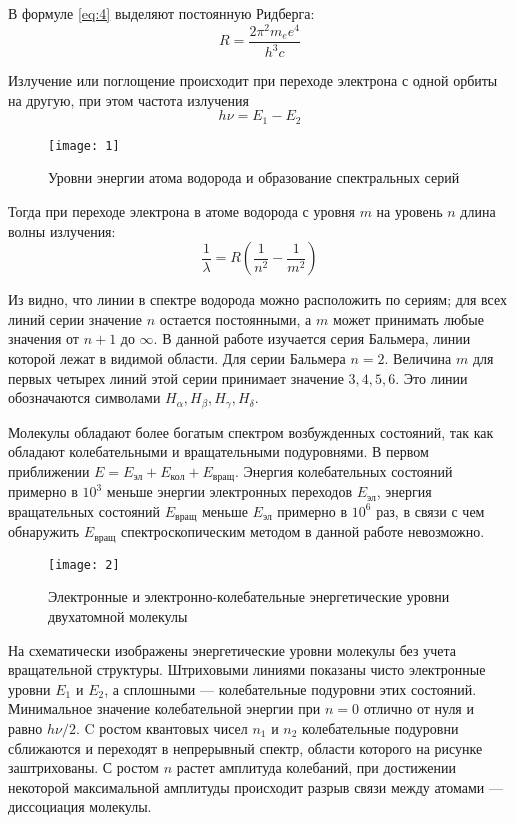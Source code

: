 \documentclass[a4paper, 12pt]{article}
\begin{document}
В формуле \eqref{eq:4} выделяют постоянную Ридберга:
\begin{equation}
    R = \frac{2 \pi^2 m_e e^4}{h^3 c}
    \label{eq:5}
\end{equation}

Излучение или поглощение происходит при
переходе электрона с одной орбиты на другую, при этом частота
излучения
\begin{equation}
    h\nu = E_1 - E_2
    \label{eq:6}
\end{equation}


\begin{wrapfigure}{l}{0.4\linewidth}
    \texttt{[image: 1]}
    \caption{Уровни энергии атома водорода и образование спектральных
    серий}
    \label{fig:1}
\end{wrapfigure}

Тогда при переходе электрона в атоме водорода с уровня $m$ на уровень
$n$ 
длина волны излучения: 
\begin{equation}
    \frac{1}{\lambda} = R \left( \frac{1}{n^2} - \frac{1}{m^2} \right)
    \label{eq:7}
\end{equation}

Из  видно, что линии в спектре водорода можно расположить
по сериям; для всех линий серии значение $n$ остается постоянными, а
$m$ может принимать любые значения от $n+1$ до $\infty$. В данной
работе изучается серия Бальмера, линии которой лежат в видимой
области. Для серии Бальмера $n=2$. Величина $m$ для первых четырех
линий этой серии принимает значение $3, 4, 5, 6$. Это линии обозначаются
символами $H_\alpha, H_\beta, H_\gamma, H_\delta$.

Молекулы обладают более богатым спектром возбужденных состояний, так
как обладают колебательными и вращательными подуровнями. В первом
приближении $E = E_\text{эл} + E_\text{кол} + E_\text{вращ}$. Энергия
колебательных состояний примерно в $10^3$ меньше энергии электронных
переходов $E_\text{эл}$, энергия вращательных состояний
$E_\text{вращ}$ меньше $E_\text{эл}$ примерно в $10^6$ раз, в связи с
чем обнаружить $E_\text{вращ}$ спектроскопическим методом в данной
работе невозможно.


\begin{figure}[H]
    \texttt{[image: 2]} 
    \caption{Электронные и электронно-колебательные энергетические
    уровни двухатомной молекулы}
    \label{fig:2}
\end{figure}

На  схематически изображены энергетические уровни молекулы
без учета вращательной структуры. Штриховыми линиями показаны чисто
электронные уровни $E_1$ и $E_2$, а сплошными --- колебательные
подуровни этих состояний. Минимальное значение колебательной энергии
при $n = 0$ отлично от нуля и равно $h \nu / 2$. C ростом квантовых
чисел $n_1$ и $n_2$ колебательные подуровни сближаются и переходят в
непрерывный спектр, области которого на рисунке заштрихованы. С ростом
$n$ растет амплитуда колебаний, при достижении некоторой максимальной
амплитуды происходит разрыв связи между атомами --- диссоциация
молекулы.
\end{document}
